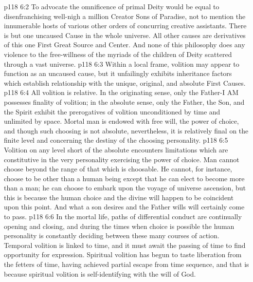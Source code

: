 \vs p118 6:2 To advocate the omnificence of primal Deity would be equal to disenfranchising well\hyp{}nigh a million Creator Sons of Paradise, not to mention the innumerable hosts of various other orders of concurring creative assistants. There is but one uncaused Cause in the whole universe. All other causes are derivatives of this one First Great Source and Center. And none of this philosophy does any violence to the free\hyp{}willness of the myriads of the children of Deity scattered through a vast universe.
\vs p118 6:3 \pc Within a local frame, volition may appear to function as an uncaused cause, but it unfailingly exhibits inheritance factors which establish relationship with the unique, original, and absolute First Causes.
\vs p118 6:4 All volition is relative. In the originating sense, only the Father\hyp{}I AM possesses finality of volition; in the absolute sense, only the Father, the Son, and the Spirit exhibit the prerogatives of volition unconditioned by time and unlimited by space. Mortal man is endowed with free will, the power of choice, and though such choosing is not absolute, nevertheless, it is relatively final on the finite level and concerning the destiny of the choosing personality.
\vs p118 6:5 Volition on any level short of the absolute encounters limitations which are constitutive in the very personality exercising the power of choice. Man cannot choose beyond the range of that which is choosable. He cannot, for instance, choose to be other than a human being except that he can elect to become more than a man; he can choose to embark upon the voyage of universe ascension, but this is because the human choice and the divine will happen to be coincident upon this point. And what a son desires and the Father wills will certainly come to pass.
\vs p118 6:6 In the mortal life, paths of differential conduct are continually opening and closing, and during the times when choice is possible the human personality is constantly deciding between these many courses of action. Temporal volition is linked to time, and it must await the passing of time to find opportunity for expression. Spiritual volition has begun to taste liberation from the fetters of time, having achieved partial escape from time sequence, and that is because spiritual volition is self\hyp{}identifying with the will of God.
